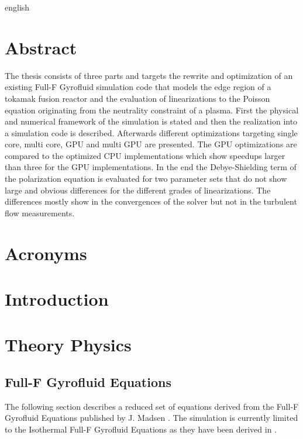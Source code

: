 \documentclass[12pt,oneside,bibtotoc,liststotoc]{scrbook}
\begin{document}
\begin{otherlanguage*}{english}
  {\let\clearpage\relax \chapter*{Abstract}}
The thesis consists of three parts and targets the rewrite and optimization of an existing Full-F Gyrofluid simulation code that models the edge region of a tokamak fusion reactor and the evaluation of linearizations to the Poisson equation originating from the neutrality constraint of a plasma. First the physical and numerical framework of the simulation is stated and then the realization into a simulation code is described. Afterwards different optimizations targeting single core, multi core, GPU and multi GPU are presented. The GPU optimizations are compared to the optimized CPU implementations which show speedups larger than three for the GPU implementations. In the end the Debye-Shielding term of the polarization equation is evaluated for two parameter sets that do not show large and obvious differences for the different grades of linearizations. The differences mostly show in the convergences of the solver but not in the turbulent flow measurements.
\end{otherlanguage*}



\renewcommand{\baselinestretch}{1.00}\normalsize

\tableofcontents

\listoffigures
\chapter*{Acronyms}

\renewcommand{\baselinestretch}{1.5}\normalsize

\newpage
\setcounter{page}{1}

\chapter{Introduction}



\chapter{Theory Physics}

\section{Full-F Gyrofluid Equations}
The following section describes a reduced set of equations derived from the Full-F Gyrofluid Equations published by J. Madsen \cite{doi:10.1063/1.4813241}.
The simulation is currently limited to the Isothermal Full-F Gyrofluid Equations as they have been derived in \cite{HeldDisseration}.
\end{document}
